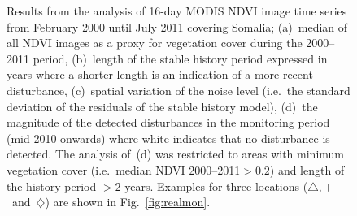 \documentclass[authoryear,preprint,review,10pt]{elsarticle}
\begin{document}
\begin{figure}[htp]
\centering
 \caption{Results from the analysis of 16-day MODIS NDVI image time series from February 2000 until July 2011 covering Somalia; (a)~median of all NDVI
 images as a proxy for vegetation cover during the 2000--2011 period, (b)~length of the stable history period expressed in years where a shorter length is an indication of a more recent disturbance, (c)~spatial variation of the noise level (i.e.\ the standard deviation of the residuals of the stable history model), (d)~the magnitude of the detected disturbances in the monitoring period (mid 2010 onwards) where white indicates that no disturbance is detected. The analysis of~(d) was restricted to areas with minimum vegetation cover (i.e.\ median NDVI  2000--2011$> 0.2$) and length of the history period $> 2$ years. Examples for three locations ($\triangle,+$~and~$\diamondsuit$) are shown in Fig.~\ref{fig:realmon}.}
 \label{fig:spatial}
\end{figure}
\end{document}
